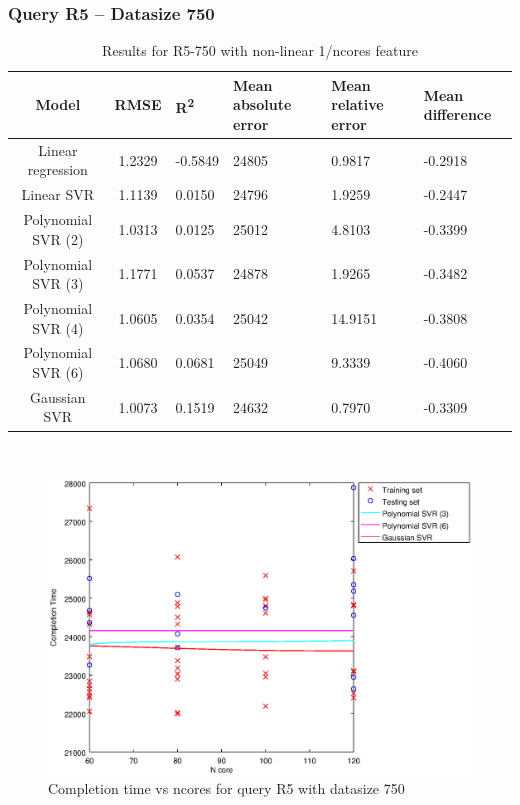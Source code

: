 \documentclass[a4paper,11pt]{article}
\begin{document}
\newpage
\subsubsection{Query R5 -- Datasize 750}
\begin{table}[H]
	\centering
	\begin{adjustbox}{center}
		\begin{tabular}{c | c M{1.2cm} M{2.5cm} M{2.5cm} M{1.8cm}}
			Model & RMSE & R\textsuperscript{2} & Mean absolute error & Mean relative error & Mean difference \tabularnewline
			\hline
			Linear regression & 1.2329 & -0.5849 &  24805 & 0.9817 & -0.2918 \\
			Linear SVR & 1.1139 & 0.0150 &  24796 & 1.9259 & -0.2447 \\
			Polynomial SVR (2) & 1.0313 & 0.0125 &  25012 & 4.8103 & -0.3399 \\
			Polynomial SVR (3) & 1.1771 & 0.0537 &  24878 & 1.9265 & -0.3482 \\
			Polynomial SVR (4) & 1.0605 & 0.0354 &  25042 & 14.9151 & -0.3808 \\
			Polynomial SVR (6) & 1.0680 & 0.0681 &  25049 & 9.3339 & -0.4060 \\
			Gaussian SVR & 1.0073 & 0.1519 &  24632 & 0.7970 & -0.3309 \\
		\end{tabular}
	\end{adjustbox}
	\\
	\caption{Results for R5-750 with non-linear 1/ncores feature}
	\label{table_R5_prediction_all}
\end{table}

\begin {figure}[hbtp]
\centering
\includegraphics[width=\textwidth]{output/R5_750_1_OVER_NCORES/plot_R5_750_bestmodels.eps}
\caption {Completion time vs ncores for query R5 with datasize 750}
\end {figure}
\end{document}
